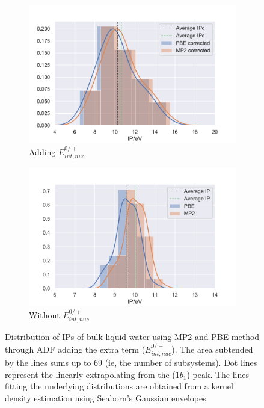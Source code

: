 \documentclass[12pt,a4paper]{article}
\begin{document}
\begin{figure}[!ht]
        \captionsetup[subfigure]{labelformat=empty}
        \centering
        \begin{subfigure}{0.4\linewidth}
		\includegraphics[width=\linewidth]{images/Corrected}
		\caption{Adding $E_{int,nuc}^{0/+}$ }
        \end{subfigure}
        \begin{subfigure}{0.4\linewidth}
                \includegraphics[width=\linewidth]{images/Without-Correction}
                \caption{Without $E_{int,nuc}^{0/+}$ }
        \end{subfigure}
        \caption{Distribution of IPs of bulk liquid water using MP2 and PBE method through ADF \cite{te2001chemistry} adding the extra term ($E_{int,nuc}^{0/+}$). The area subtended by the lines sums up to 69 (ie, the number of subsystems). Dot lines represent the linearly extrapolating from the ($1b_{1}$) peak. The lines fitting the underlying distributions are obtained from a kernel density estimation using Seaborn's Gaussian envelopes\cite{waskom2017c}}
\end{figure}
\end{document}
